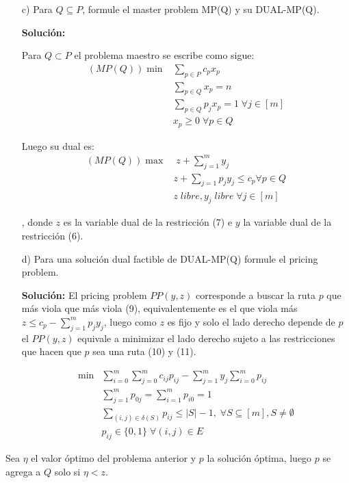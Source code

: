 \documentclass[10pt]{article}
\theoremstyle{plain}
\theoremstyle{definition}
\begin{document}
\begin{itemize}
\item[c)] Para $Q\subseteq P$, formule el master problem MP(Q) y su DUAL-MP(Q).

\textbf{Solución:}

Para $Q\subset P$ el problema maestro se escribe como sigue:
\begin{align}
    (MP(Q))\min & \sum_{p\in P}c_{p}x_{p}\nonumber\\
    & \sum_{p\in Q}x_{p}=n\\
    & \sum_{p\in Q}p_{j}x_{p} = 1 \; \forall j \in [m]\\
    & x_{p}\geq 0 \; \forall p \in Q\nonumber
\end{align}

Luego su dual es:
\begin{align}
    (MP(Q))\max & \;z+\sum_{j=1}^{m}y_{j}\nonumber\\
    & z+\sum_{j=1}p_{j}y_{j}\leq c_{p} \forall p \in Q\\
    & z \; libre, y_{j} \; libre \;\forall j \in [m]\nonumber
\end{align}

, donde $z$ es la variable dual de la restricción (7) e $y$ la variable dual de la restricción (6).

\item[d)] Para una solución dual factible de DUAL-MP(Q) formule el pricing problem.

\textbf{Solución:}
El pricing problem $PP(y,z)$ corresponde a buscar la ruta $p$ que más viola que más viola (9), equivalentemente es el que viola más $z\leq c_{p}-\sum_{j=1}^{m}p_{j}y_{j}$, luego como $z$ es fijo y solo el lado derecho depende de $p$ el $PP(y,z)$ equivale a minimizar el lado derecho sujeto a las restricciones que hacen que $p$ sea una ruta (10) y (11).

\begin{align}
    \min & \sum_{i=0}^{m}\sum_{j=0}^{m}c_{ij}p_{ij}-\sum_{j=1}^{m}y_{j}\sum_{i=0}^{m}p_{ij}\nonumber\\
    & \sum_{j=1}^{m}p_{0j}=\sum_{i=1}^{m}p_{i0}=1\\
    & \sum_{(i,j)\in \delta(S)}p_{ij}\leq |S|-1, \; \forall S\subseteq [m], S\neq\emptyset\\
    & p_{ij}\in\{0,1\} \;\forall (i,j) \in E\nonumber
\end{align}
\end{itemize}

Sea $\eta$ el valor óptimo del problema anterior y $p$ la solución óptima, luego $p$ se agrega a $Q$ solo si $\eta<z$. 
\end{document}
